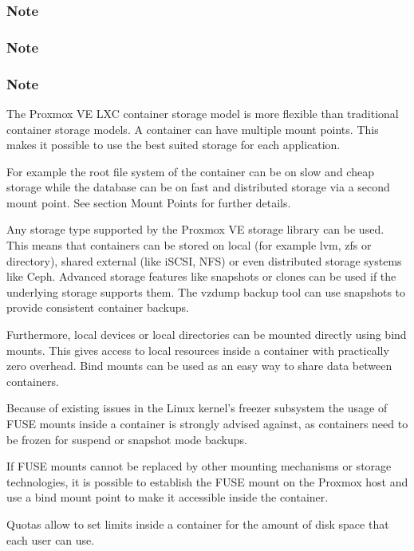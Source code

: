 \subsubsection{Note}

\subsubsection{Note}

\subsubsection{Note}

The Proxmox VE LXC container storage model is more flexible than traditional container storage models. A container can have multiple mount points. This makes it possible to use the best suited storage for each application.

For example the root file system of the container can be on slow and cheap storage while the database can be on fast and distributed storage via a second mount point. See section Mount Points for further details.

Any storage type supported by the Proxmox VE storage library can be used. This means that containers can be stored on local (for example lvm, zfs or directory), shared external (like iSCSI, NFS) or even distributed storage systems like Ceph. Advanced storage features like snapshots or clones can be used if the underlying storage supports them. The vzdump backup tool can use snapshots to provide consistent container backups.

Furthermore, local devices or local directories can be mounted directly using bind mounts. This gives access to local resources inside a container with practically zero overhead. Bind mounts can be used as an easy way to share data between containers.

Because of existing issues in the Linux kernel’s freezer subsystem the usage of FUSE mounts inside a container is strongly advised against, as containers need to be frozen for suspend or snapshot mode backups.

If FUSE mounts cannot be replaced by other mounting mechanisms or storage technologies, it is possible to establish the FUSE mount on the Proxmox host and use a bind mount point to make it accessible inside the container.

Quotas allow to set limits inside a container for the amount of disk space that each user can use.

